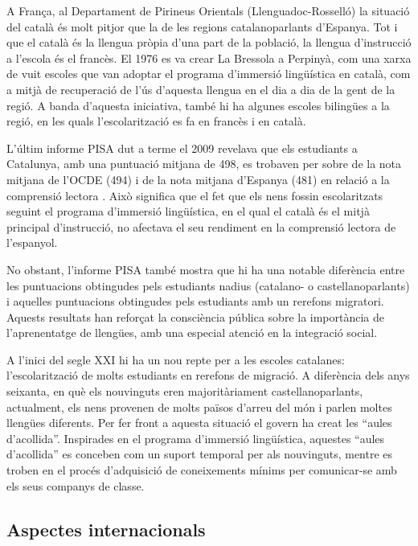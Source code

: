 \begin{multicols}{2}
A França, al Departament de Pirineus Orientals (Llenguadoc-Rosselló) la situació del català és molt pitjor que la de les regions catalanoparlants d’Espanya. Tot i que el català és la llengua pròpia d’una part de la població, la llengua d’instrucció a l’escola és el francès. El 1976 es va crear La Bressola \cite{CAT-Nota6} a Perpinyà, com una xarxa de vuit escoles que van adoptar el programa d’immersió lingüística en català, com a mitjà de recuperació de l’ús d’aquesta llengua en el dia a dia de la gent de la regió. A banda d’aquesta iniciativa, també hi ha algunes escoles bilingües a la regió, en les quals l’escolarització es fa en francès i en català.

L’últim informe PISA dut a terme el 2009 revelava que els estudiants a Catalunya, amb una puntuació mitjana de 498, es trobaven per sobre de la nota mitjana de l’OCDE (494) i de la nota mitjana d’Espanya (481) en relació a la comprensió lectora \cite{CAT-Nota7}. Això significa que el fet que els nens fossin escolaritzats seguint el programa d’immersió lingüística, en el qual el català és el mitjà principal d’instrucció, no afectava el seu rendiment en la comprensió lectora de l’espanyol.

No obstant, l’informe PISA també mostra que hi ha una notable diferència entre les puntuacions obtingudes pels estudiants nadius (catalano- o castellanoparlants) i aquelles puntuacions obtingudes pels estudiants amb un rerefons migratori. Aquests resultats han reforçat la consciència pública sobre la importància de l’aprenentatge de llengües, amb una especial atenció en la integració social. 

A l’inici del segle XXI hi ha un nou repte per a les escoles catalanes: l’escolarització de molts estudiants en rerefons de migració. A diferència dels anys seixanta, en què els nouvinguts eren majoritàriament castellanoparlants, actualment, els nens provenen de molts països d’arreu del món i parlen moltes llengües diferents. Per fer front a aquesta situació el govern ha creat les “aules d’acollida”. Inspirades en el programa d’immersió lingüística, aquestes “aules d’acollida” es conceben com un suport temporal per als nouvinguts, mentre es troben en el procés d’adquisició de coneixements mínims per comunicar-se amb els seus companys de classe.

\subsection{Aspectes internacionals}


\end{multicols}
